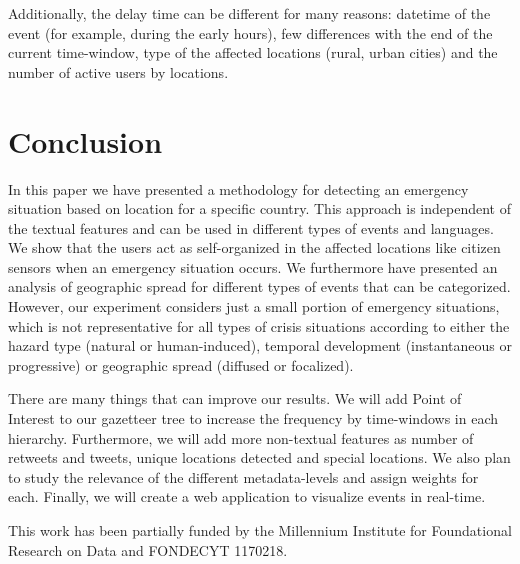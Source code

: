 \documentclass[sigconf]{acmart}
\begin{document}
Additionally, the delay time can be different for many reasons: datetime of the event (for example, during the early hours), few differences with the end of the current time-window, type of the affected locations (rural, urban cities) and the number of active users by locations.



\section{Conclusion}

In this paper we have presented a methodology for detecting an emergency situation based on location for a specific country. This approach is independent of the textual features and can be used in different types of events and languages. We show that the users act as self-organized in the affected locations like citizen sensors when an emergency situation occurs. We furthermore have presented an analysis of geographic spread for different types of events that can be categorized. However, our experiment considers just a small portion of emergency situations, which is not representative for all types of crisis situations according to either the hazard type (natural or human-induced), temporal development (instantaneous or progressive) or geographic spread (diffused or focalized).

There are many things that can improve our results. We will add Point of Interest to our gazetteer tree to increase the frequency by time-windows in each hierarchy. Furthermore, we will add more non-textual features as number of retweets and tweets, unique locations detected and special locations. We also plan to study the relevance of the different metadata-levels and assign weights for each. Finally, we will create a web application to visualize events in real-time.

\begin{acks}
This work has been partially funded by the Millennium Institute for Foundational Research on Data and FONDECYT 1170218.	
\end{acks}



 
\end{document}

